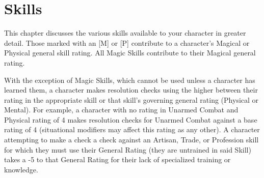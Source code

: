 \documentclass[oneside]{book}
\begin{document}
\onecolumn

\chapter{Skills}
This chapter discusses the various skills available to your character in greater detail. Those marked with an [M] or [P] contribute to a character's Magical or Physical general skill rating. All Magic Skills contribute to their Magical general rating.

With the exception of Magic Skills, which cannot be used unless a character has learned them, a character makes resolution checks using the higher between their rating in the appropriate skill or that skill's governing general rating (Physical or Mental). For example, a character with no rating in Unarmed Combat and Physical rating of 4 makes resolution checks for Unarmed Combat against a base rating of 4 (situational modifiers may affect this rating as any other). A character attempting to make a check a check against an Artisan, Trade, or Profession skill for which they must use their General Rating (they are untrained in said Skill) takes a -5 to that General Rating for their lack of specialized training or knowledge.
\newpage
\end{document}
